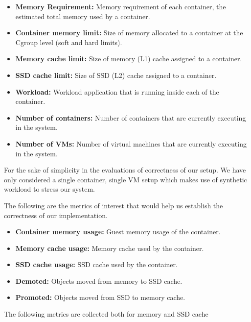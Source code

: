 	  \begin{itemize}
	   \item \textbf{Memory Requirement:} Memory requirement of each container, the estimated total memory used by a container.
	   
	   \item \textbf{Container memory limit:} Size of memory allocated to a container at the Cgroup level (soft and hard limits). 
	   \item \textbf{Memory cache limit:} Size of memory (L1) cache assigned to a container. 
	   \item \textbf{SSD cache limit:} Size of SSD (L2) cache assigned to a container.
	   
	   \item \textbf{Workload:} Workload application that is running inside each of the container. 
	   \item \textbf{Number of containers:} Number of containers that are currently executing in the system.
	   \item \textbf{Number of VMs:} Number of virtual machines that are currently executing in the system.
	  \end{itemize}	  
	  
	  For the sake of simplicity in the evaluations of correctness of our setup. We have only considered a single container, single VM setup 
	  which makes use of synthetic workload to stress our system.
	
	The following are the metrics of interest that would help us establish the correctness of our implementation.
	  
	  \begin{itemize}
	   
	   \item \textbf{Container memory usage:} Guest memory usage of the container.
	   \item \textbf{Memory cache usage:} Memory cache used by the container.
	   \item \textbf{SSD cache usage:} SSD cache used by the container.
	   
	   \item \textbf{Demoted:} Objects moved from memory to SSD cache.
	   \item \textbf{Promoted:} Objects moved from SSD to memory cache.
	   
	  \end{itemize}	  
	  
	  The following metrics are collected both for memory and SSD cache
	  
